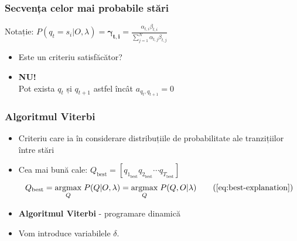 \begin{frame}
  \frametitle{Secvența celor mai probabile stări}
  Notație: $P(q_t = s_i \vert O, \lambda) = \mathbf{\gamma_{t,i}} = 
  \frac{\alpha_{t,i}\beta_{t,i}}{\displaystyle\sum_{j=1}^{N}\alpha_{t,j}\beta_{t,j}}$
  \begin{itemize}
  \item Este un criteriu satisfăcător?\pause
  \item \textbf{NU!}\\Pot exista $q_t$ și $q_{t+1}$ astfel încât $a_{q_t,q_{t+1}}=0$
  \end{itemize}

\end{frame}

\begin{frame}
  \frametitle{Algoritmul Viterbi}
  \begin{itemize}
  \item Criteriu care ia în considerare distribuțiile de probabilitate 
    ale tranzițiilor între stări
  \item Cea mai bună cale:
    $Q_{\text{best}} = [q_{1_{\text{best}}} q_{2_{\text{best}}} \cdots q_{T_{\text{best}}}]$
    \begin{equation}
      Q_{\text{best}} = \underset{Q}{\operatorname{argmax}}\;
      P(Q \vert O, \lambda)
      = \underset{Q}{\operatorname{argmax}}\; P(Q, O \vert \lambda)
      \tag{\ref{eq:best-explanation}}
    \end{equation}
  \item \textbf{Algoritmul Viterbi} - programare dinamică \citep{viterbi1967error}
  \item Vom introduce variabilele $\delta$.
  \end{itemize}
\end{frame}


